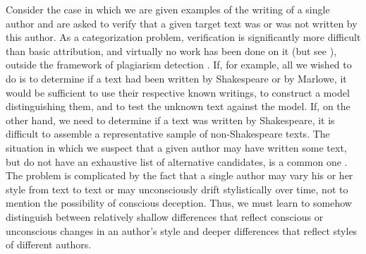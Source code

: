 Consider the case in which we are given examples of the writing of a single author and are asked to verify that a given target text was or was not written by this author. As a categorization problem, verification is significantly more difficult than basic attribution, and virtually no work has been done on it (but see \citeauthor{halteren2004linguistic} \citeyear{halteren2004linguistic}), outside the framework of plagiarism detection \citeauthor{zu2007plagiarism} \citeyear{zu2007plagiarism}. If, for example, all we wished to do is to determine if a text had been written by Shakespeare or by Marlowe, it would be sufficient to use their respective known writings, to construct a model distinguishing them, and to test the unknown text against the model. If, on the other hand, we need
to determine if a text was written by Shakespeare, it is difficult to assemble a representative sample of non-Shakespeare texts.
The situation in which we suspect that a given author may have written some text, but do not have an exhaustive list of alternative candidates, is a common one \cite{koppel2009computational}. The problem is complicated by the fact that a single author may vary his or her style from text to text or may unconsciously drift stylistically over time, not to mention the possibility of conscious deception. Thus, we must learn to somehow distinguish between relatively shallow differences that reflect conscious or unconscious changes in an author’s style and deeper differences that reflect styles of different authors.
